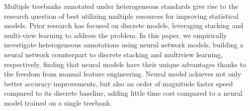 Multiple treebanks annotated under heterogeneous standards give rise to the research question of best utilizing multiple resources for improving statistical models. Prior research has focused on discrete models, leveraging stacking and multi-view learning to address the problem. In this paper, we empirically investigate heterogeneous annotations using neural network models, building a neural network counterpart to discrete stacking and multiview learning, respectively, finding that neural models have their unique advantages thanks to the freedom from manual feature engineering. Neural model achieves not only better accuracy improvements, but also an order of magnitude faster speed compared to its discrete baseline, adding little time cost compared to a neural model trained on a single treebank.
